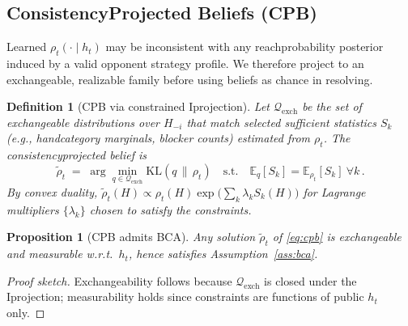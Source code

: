 \documentclass[10pt]{article}
\newcommand{\E}{\mathbb{E}}
\newcommand{\KL}{\mathrm{KL}}
\newcommand{\1}{\mathbf{1}}
\theoremstyle{plain}
\newtheorem{definition}{Definition}
\newtheorem{proposition}{Proposition}
\begin{document}
\subsection{Consistency\textendash Projected Beliefs (CPB)}
\label{sec:cpb}
Learned $\rho_t(\cdot\mid h_t)$ may be inconsistent with any reach\textendash probability posterior induced by a valid opponent strategy profile. We therefore project to an exchangeable, realizable family before using beliefs as chance in re\textendash solving.
\begin{definition}[CPB via constrained I\textendash projection]
\label{def:cpb}
Let $\mathcal{Q}_{\text{exch}}$ be the set of exchangeable distributions over $H_{-i}$ that match selected sufficient statistics $S_k$ (e.g., hand\textendash category marginals, blocker counts) estimated from $\rho_t$. The \emph{consistency\textendash projected belief} is
\begin{equation}
\label{eq:cpb}
  \tilde{\rho}_t \;=\; \arg\min_{q \in \mathcal{Q}_{\text{exch}}} \KL\!\left(q \,\|\, \rho_t\right)\quad \text{s.t.}\quad \E_q[S_k]=\E_{\rho_t}[S_k] \ \forall k\,.
\end{equation}
By convex duality, $\tilde{\rho}_t(H)\propto \rho_t(H)\exp\!\big(\sum_k \lambda_k S_k(H)\big)$ for Lagrange multipliers $\{\lambda_k\}$ chosen to satisfy the constraints.
\end{definition}
\begin{proposition}[CPB admits BCA]
\label{prop:cpb_bca}
Any solution $\tilde{\rho}_t$ of \cref{eq:cpb} is exchangeable and measurable w.r.t.\ $h_t$, hence satisfies Assumption~\ref{ass:bca}.
\end{proposition}
\begin{proof}[Proof sketch]
Exchangeability follows because $\mathcal{Q}_{\text{exch}}$ is closed under the I\textendash projection; measurability holds since constraints are functions of public $h_t$ only. 
\end{proof}
\end{document}
